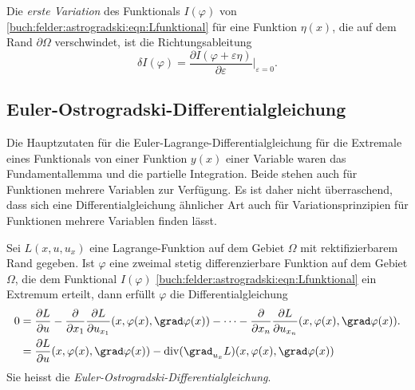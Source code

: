 \begin{definition}[1.~Variation]
Die {\em erste Variation} des Funktionals $I(\varphi)$ von
\eqref{buch:felder:astrogradski:eqn:Lfunktional}
für eine Funktion $\eta(x)$, die auf dem Rand $\partial\Omega$ verschwindet,
ist die Richtungsableitung
\[
\delta I(\varphi)
=
\frac{\partial I(\varphi+\varepsilon \eta)}{\partial \varepsilon}
\bigg|_{\varepsilon=0}.
\]
\end{definition}

%
%
\subsection{Euler-Ostrogradski-Differentialgleichung}
Die Hauptzutaten für die Euler-Lagrange-Differentialgleichung für
die Extremale eines Funktionals von einer Funktion $y(x)$ einer
Variable waren das Fundamentallemma und die partielle Integration.
Beide stehen auch für Funktionen mehrere Variablen zur Verfügung.
Es ist daher nicht überraschend, dass sich eine Differentialgleichung
ähnlicher Art auch für Variationsprinzipien für Funktionen mehrere
Variablen finden lässt.

\begin{satz}
Sei $L(x,u,u_x)$ eine Lagrange-Funktion auf dem Gebiet $\Omega$ mit
rektifizierbarem Rand gegeben.
Ist $\varphi$ eine zweimal stetig differenzierbare Funktion auf
dem Gebiet $\Omega$, die dem Funktional $I(\varphi)$ 
\eqref{buch:felder:astrogradski:eqn:Lfunktional}
ein Extremum erteilt, dann erfüllt $\varphi$ die Differentialgleichung
\begin{equation}
\begin{aligned}
0
&=
\frac{\partial L}{\partial u} 
-
\frac{\partial}{\partial x_1}
\frac{\partial L}{\partial u_{x_1}}(x,\varphi(x),\grad\varphi(x))
-
\dots
-
\frac{\partial}{\partial x_n}
\frac{\partial L}{\partial u_{x_n}}(x,\varphi(x),\grad\varphi(x)).
\\
&=
\frac{\partial L}{\partial u}(x,\varphi(x),\grad\varphi(x))
-
\operatorname{div}
(\grad_{u_x} L)(x,\varphi(x),\grad\varphi(x))
\end{aligned}
\label{buch:felder:ostrogradski:eqn:euler-ostrogradski}
\end{equation}
Sie heisst die {\em Euler-Ostrogradski-Differentialgleichung}.
%
\end{satz}

